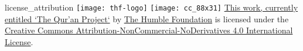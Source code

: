 \begin{comment}
The following tags are declared here:-
license_attribution
\end{comment}
\begin{taggedblock}{license_attribution}
\texttt{[image: thf-logo]}
\texttt{[image: cc\_88x31]}
\href{http://github.com/humblefoundation/quran-project}{This work, currently entitled `The Qur'an Project`} by \href{http://www.humblefoundation.org}{The Humble Foundation} is licensed under the \href{http://creativecommons.org/licenses/by-nc-nd/4.0/}{Creative Commons Attribution-NonCommercial-NoDerivatives 4.0 International License}.
\end{taggedblock}